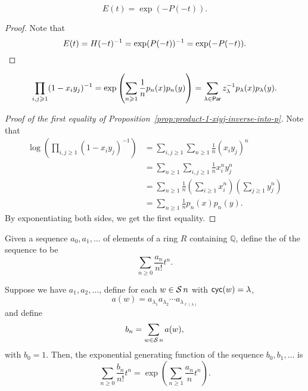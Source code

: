 \begin{lemma} \label{lem:E-equals-mexp-mP}
	\begin{equation}
		E(t) = \exp(-P(-t)).
	\end{equation}	
\end{lemma}

\begin{proof}
	Note that
	\begin{equation}
		E(t) = H(-t)^{-1} = \exp(P(-t))^{-1} = \exp(-P(-t)). \qedhere
	\end{equation}	
\end{proof}

\begin{proposition} \label{prop:product-1-xiyj-inverse-into-p}
	\begin{equation}
		\prod_{i, j \geqslant 1} (1 - x_iy_j)^{-1}
		= \exp\left( \sum_{n \geqslant 1} \frac{1}{n} p_n(x) p_n(y) \right)
		= \sum_{\lambda \in \operatorname{\mathsf{Par}}} z_\lambda^{-1} p_\lambda(x) p_\lambda(y).
	\end{equation}
\end{proposition}

\begin{proof}[Proof of the first equality of Proposition~\ref{prop:product-1-xiyj-inverse-into-p}]
	Note that
	\begin{align}
		\log\left(
			\prod_{i, j \geq 1} (1 - x_iy_j)^{-1}
		\right)
		&= \sum_{i, j \geq 1} \sum_{n \geq 1} \frac{1}{n} (x_iy_j)^n \\
		&= \sum_{n \geq 1} \sum_{i, j \geq 1} \frac{1}{n} x_i^n y_j^n \\
		&= \sum_{n \geq 1} \frac{1}{n} \left(\sum_{i \geq 1} x_i^n\right) \left(\sum_{j \geq 1} y_j^n\right) \\
		&= \sum_{n \geq 1} \frac{1}{n} p_n(x) p_n(y).
	\end{align}
	By exponentiating both sides, we get the first equality.
\end{proof}

Given a sequence \(a_0, a_1, \ldots\) of elements of a ring \(R\) containing \(\mathbb{Q}\), define the  of the sequence to be
\begin{equation}
	\sum_{n \geq 0} \frac{a_n}{n!} t^n.
\end{equation}

\begin{fact} \label{fact:egf-cyc-prod}
	Suppose we have \(a_1, a_2, \ldots\), define for each \(w \in \operatorname{\mathcal{S}}{n}\) with \(\operatorname{\mathsf{cyc}}(w) = \lambda\),
	\begin{equation}
		a(w) = a_{\lambda_1}a_{\lambda_2}\cdots a_{\lambda_{\ell(\lambda)}}
	\end{equation}
	and define 
	\begin{equation}
		b_n = \sum_{w \in \operatorname{\mathcal{S}}{n}} a(w),
	\end{equation}
	with \(b_0 = 1\).
	Then, the exponential generating function of the sequence \(b_0, b_1, \ldots\) is
	\begin{equation}
		\sum_{n \geq 0} \frac{b_n}{n!} t^n
		=
		\exp\left( \sum_{n \geq 1} \frac{a_n}{n} t^n \right).
	\end{equation}
\end{fact}

